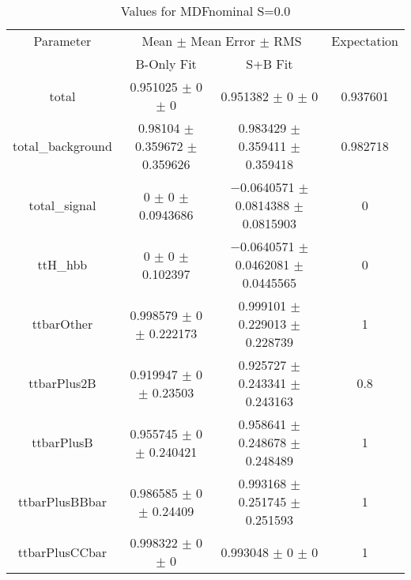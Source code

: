 \begin{table}
\centering
\caption{Values for MDFnominal S=0.0}
\begin{tabular}{cccc}
\toprule
Parameter & \multicolumn{2}{c}{Mean $\pm$ Mean Error $\pm$ RMS} & Expectation\\
 & B-Only Fit & S+B Fit & \\
\midrule
total & \num{0.951025} $\pm$ \num{0} $\pm$ \num{0} & \num{0.951382} $\pm$ \num{0} $\pm$ \num{0} & \num{0.937601}\\
total\_background & \num{0.98104} $\pm$ \num{0.359672} $\pm$ \num{0.359626} & \num{0.983429} $\pm$ \num{0.359411} $\pm$ \num{0.359418} & \num{0.982718}\\
total\_signal & \num{0} $\pm$ \num{0} $\pm$ \num{0.0943686} & \num{-0.0640571} $\pm$ \num{0.0814388} $\pm$ \num{0.0815903} & \num{0}\\
ttH\_hbb & \num{0} $\pm$ \num{0} $\pm$ \num{0.102397} & \num{-0.0640571} $\pm$ \num{0.0462081} $\pm$ \num{0.0445565} & \num{0}\\
ttbarOther & \num{0.998579} $\pm$ \num{0} $\pm$ \num{0.222173} & \num{0.999101} $\pm$ \num{0.229013} $\pm$ \num{0.228739} & \num{1}\\
ttbarPlus2B & \num{0.919947} $\pm$ \num{0} $\pm$ \num{0.23503} & \num{0.925727} $\pm$ \num{0.243341} $\pm$ \num{0.243163} & \num{0.8}\\
ttbarPlusB & \num{0.955745} $\pm$ \num{0} $\pm$ \num{0.240421} & \num{0.958641} $\pm$ \num{0.248678} $\pm$ \num{0.248489} & \num{1}\\
ttbarPlusBBbar & \num{0.986585} $\pm$ \num{0} $\pm$ \num{0.24409} & \num{0.993168} $\pm$ \num{0.251745} $\pm$ \num{0.251593} & \num{1}\\
ttbarPlusCCbar & \num{0.998322} $\pm$ \num{0} $\pm$ \num{0} & \num{0.993048} $\pm$ \num{0} $\pm$ \num{0} & \num{1}\\
\bottomrule
\end{tabular}
\end{table}